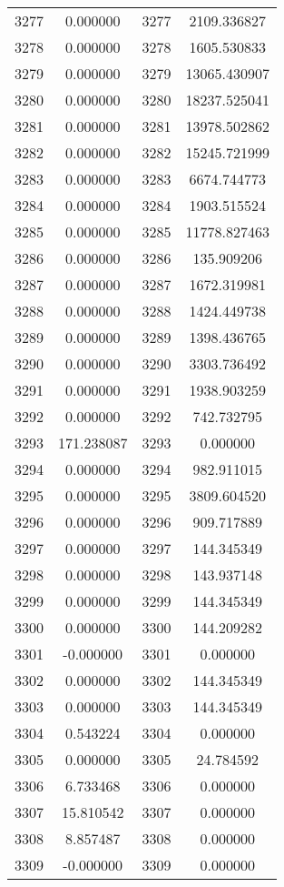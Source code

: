 \documentclass[12pt]{article}
\begin{document}
\begin{longtable}{@{}cccc@{}}
3277 & 0.000000 & 3277 & 2109.336827 \\
3278 & 0.000000 & 3278 & 1605.530833 \\
3279 & 0.000000 & 3279 & 13065.430907 \\
3280 & 0.000000 & 3280 & 18237.525041 \\
3281 & 0.000000 & 3281 & 13978.502862 \\
3282 & 0.000000 & 3282 & 15245.721999 \\
3283 & 0.000000 & 3283 & 6674.744773 \\
3284 & 0.000000 & 3284 & 1903.515524 \\
3285 & 0.000000 & 3285 & 11778.827463 \\
3286 & 0.000000 & 3286 & 135.909206 \\
3287 & 0.000000 & 3287 & 1672.319981 \\
3288 & 0.000000 & 3288 & 1424.449738 \\
3289 & 0.000000 & 3289 & 1398.436765 \\
3290 & 0.000000 & 3290 & 3303.736492 \\
3291 & 0.000000 & 3291 & 1938.903259 \\
3292 & 0.000000 & 3292 & 742.732795 \\
3293 & 171.238087 & 3293 & 0.000000 \\
3294 & 0.000000 & 3294 & 982.911015 \\
3295 & 0.000000 & 3295 & 3809.604520 \\
3296 & 0.000000 & 3296 & 909.717889 \\
3297 & 0.000000 & 3297 & 144.345349 \\
3298 & 0.000000 & 3298 & 143.937148 \\
3299 & 0.000000 & 3299 & 144.345349 \\
3300 & 0.000000 & 3300 & 144.209282 \\
3301 & -0.000000 & 3301 & 0.000000 \\
3302 & 0.000000 & 3302 & 144.345349 \\
3303 & 0.000000 & 3303 & 144.345349 \\
3304 & 0.543224 & 3304 & 0.000000 \\
3305 & 0.000000 & 3305 & 24.784592 \\
3306 & 6.733468 & 3306 & 0.000000 \\
3307 & 15.810542 & 3307 & 0.000000 \\
3308 & 8.857487 & 3308 & 0.000000 \\
3309 & -0.000000 & 3309 & 0.000000 \\

\end{longtable}
\end{document}

